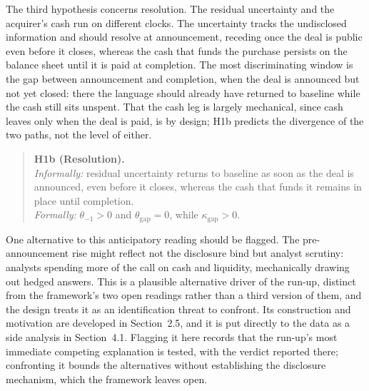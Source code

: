 The third hypothesis concerns resolution. The residual uncertainty and the acquirer's cash run on different clocks. The uncertainty tracks the undisclosed information and should resolve at announcement, receding once the deal is public even before it closes, whereas the cash that funds the purchase persists on the balance sheet until it is paid at completion. The most discriminating window is the gap between announcement and completion, when the deal is announced but not yet closed: there the language should already have returned to baseline while the cash still sits unspent. That the cash leg is largely mechanical, since cash leaves only when the deal is paid, is by design; H1b predicts the divergence of the two paths, not the level of either.
\begin{quote}
\textbf{H1b (Resolution).}\\
\emph{Informally:} residual uncertainty returns to baseline as soon as the deal is announced, even before it closes, whereas the cash that funds it remains in place until completion.\\
\emph{Formally:} $\theta_{-1}>0$ and $\theta_{\mathrm{gap}}=0$, while $\kappa_{\mathrm{gap}}>0$.
\end{quote}

One alternative to this anticipatory reading should be flagged. The pre-announcement rise might reflect not the disclosure bind but analyst scrutiny: analysts spending more of the call on cash and liquidity, mechanically drawing out hedged answers. This is a plausible alternative driver of the run-up, distinct from the framework's two open readings rather than a third version of them, and the design treats it as an identification threat to confront. Its construction and motivation are developed in Section~2.5, and it is put directly to the data as a side analysis in Section~4.1. Flagging it here records that the run-up's most immediate competing explanation is tested, with the verdict reported there; confronting it bounds the alternatives without establishing the disclosure mechanism, which the framework leaves open.
